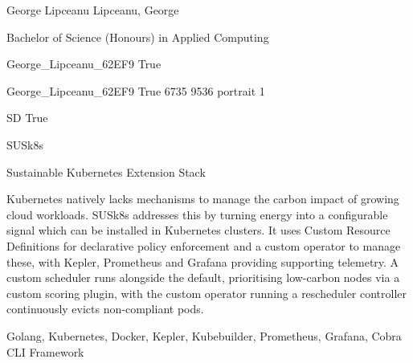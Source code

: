 
\begingroup{}\relax



\def\Key{George_Lipceanu_62EF9}

{George Lipceanu}
{Lipceanu, George}

{Bachelor of Science (Honours) in Applied Computing}

{George_Lipceanu_62EF9}
{True}

{George_Lipceanu_62EF9}
{True}
{6735}
{9536}
{portrait}
{1}

{SD}
{True}

{SUSk8s}

{Sustainable Kubernetes Extension Stack}

{Kubernetes natively lacks mechanisms to manage the carbon impact of growing cloud workloads. SUSk8s addresses this by turning energy into a configurable signal which can be installed in Kubernetes clusters. It uses Custom Resource Definitions for declarative policy enforcement and a custom operator to manage these, with Kepler, Prometheus and Grafana providing supporting telemetry.  A custom scheduler runs alongside the default, prioritising low-carbon nodes via a custom scoring plugin, with the custom operator running a rescheduler controller continuously evicts non-compliant pods.}

{Golang, Kubernetes, Docker, Kepler, Kubebuilder, Prometheus, Grafana, Cobra CLI Framework}

